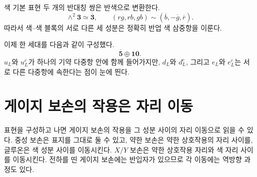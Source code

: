 \begin{classroomqa}
\end{classroomqa}

\begin{classroomqa}
\end{classroomqa}

색 기본 표현 두 개의 반대칭 쌍은 반색으로 변환한다.
\begin{equation}
\wedge^2\mathbf3\simeq\overline{\mathbf3},
\qquad
(rg,rb,gb)\sim(\overline b,-\overline g,\overline r).
\label{eq:l10-anticolor}
\end{equation}
따라서 색--색 블록의 서로 다른 세 성분은 정확히 반업 색 삼중항을 이룬다.

이제 한 세대를 다음과 같이 구성했다.
\begin{equation}
\overline{\mathbf5}\oplus\mathbf{10}.
\label{eq:l10-family}
\end{equation}
\(u_L\)와 \(u^c_L\)가 하나의 기약 다중항 안에 함께 들어가지만, \(d_L\)와 \(d^c_L\), 그리고 \(e_L\)와 \(e^c_L\)는 서로 다른 다중항에 속한다는 점이 눈에 띈다.

\begin{classroomqa}
\end{classroomqa}

\section{게이지 보손의 작용은 자리 이동}

표현을 구성하고 나면 게이지 보손의 작용을 그 성분 사이의 자리 이동으로 읽을 수 있다. 중성 보손은 표지를 그대로 둘 수 있고, 약한 보손은 약한 상호작용의 자리 사이를, 글루온은 색 성분 사이를 이동시킨다. \(X/Y\) 보손은 약한 상호작용 자리와 색 자리 사이를 이동시킨다. 전하를 띤 게이지 보손에는 반입자가 있으므로 각 이동에는 역방향 과정도 있다.

